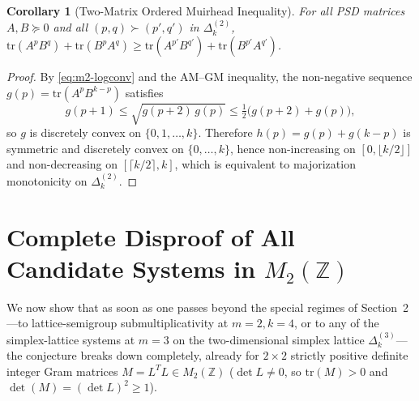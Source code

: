 \documentclass[11pt,a4paper]{article}
\newtheorem{corollary}[theorem]{Corollary}
\theoremstyle{definition}
\theoremstyle{remark}
\newcommand{\tr}{\mathrm{tr}}
\newcommand{\DeltaLat}{\Delta}
\begin{document}
\begin{corollary}[Two-Matrix Ordered Muirhead Inequality]\label{cor:m2-muirhead}
For all PSD matrices $A, B \succeq 0$ and all $(p, q) \succ (p', q')$ in $\DeltaLat_k^{(2)}$, $\tr(A^p B^q) + \tr(B^p A^q) \ge \tr(A^{p'} B^{q'}) + \tr(B^{p'} A^{q'})$.
\end{corollary}
\begin{proof}
By \eqref{eq:m2-logconv} and the AM--GM inequality, the non-negative sequence $g(p) = \tr(A^p B^{k-p})$ satisfies
\[
g(p+1) \le \sqrt{g(p+2)\,g(p)} \le \tfrac{1}{2}\bigl(g(p+2) + g(p)\bigr),
\]
so $g$ is discretely convex on $\{0,1,\dots,k\}$. Therefore $h(p) = g(p) + g(k-p)$ is symmetric and discretely convex on $\{0,\dots,k\}$, hence non-increasing on $[0, \lfloor k/2 \rfloor]$ and non-decreasing on $[\lceil k/2 \rceil, k]$, which is equivalent to majorization monotonicity on $\DeltaLat_k^{(2)}$.
\end{proof}

\section{Complete Disproof of All Candidate Systems in $M_2(\mathbb{Z})$}

We now show that as soon as one passes beyond the special regimes of Section~2---to lattice-semigroup submultiplicativity at $m = 2, k = 4$, or to any of the simplex-lattice systems at $m = 3$ on the two-dimensional simplex lattice $\DeltaLat_k^{(3)}$---the conjecture breaks down completely, already for $2 \times 2$ strictly positive definite integer Gram matrices $M = L^T L \in M_2(\mathbb{Z})$ ($\det L \ne 0$, so $\tr(M) > 0$ and $\det(M) = (\det L)^2 \ge 1$).
\end{document}
